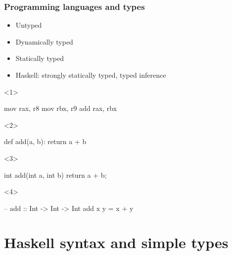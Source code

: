 \documentclass[17pt]{beamer}
\renewcommand{\(}[1]{\begin{columns}[#1]}
\renewcommand{\)}{\end{columns}}
\newcommand{\<}[1]{\begin{column}{#1}}
\renewcommand{\>}{\end{column}}
\begin{document}
\begin{frame}[fragile]
  \frametitle{Programming languages and types}
  \begin{minipage}[t][.3\textheight]{\textwidth}
    \begin{itemize}
      \item<1-> Untyped
      \item<2-> Dynamically typed
      \item<3-> Statically typed
      \item<4-> Haskell: strongly statically typed, typed inference
    \end{itemize}
  \end{minipage}
  \begin{minipage}[c][.4\textheight]{\textwidth}
  \begin{center}
    \begin{onlyenv}<1>
      \begin{ccode}[asm]
mov rax, r8
mov rbx, r9
add rax, rbx
      \end{ccode}
    \end{onlyenv}
    \begin{onlyenv}<2>
      \begin{pycode}
def add(a, b):
  return a + b
      \end{pycode}
    \end{onlyenv}
    \begin{onlyenv}<3>
      \begin{ccode}
int add(int a, int b) {
  return a + b;
}
      \end{ccode}
    \end{onlyenv}
    \begin{onlyenv}<4>
      \begin{code}
-- add :: Int -> Int -> Int
add x y = x + y
      \end{code}
    \end{onlyenv}
  \end{center}
  \end{minipage}
\end{frame}

\section{Haskell syntax and simple types}
\end{document}
